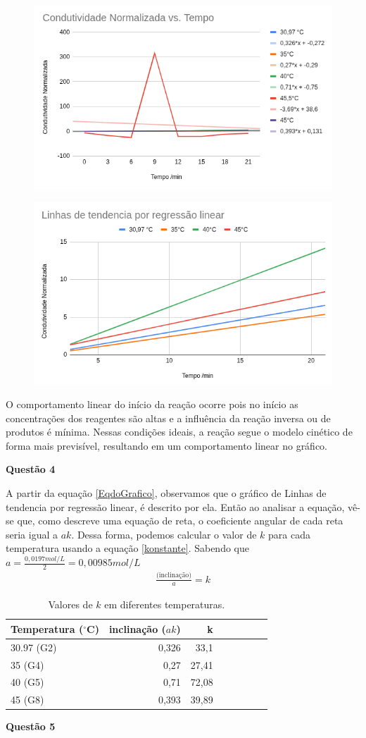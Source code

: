 \documentclass{article}
\begin{document}
\begin{figure}[H]
    \centering
    \includegraphics[width=.5\linewidth]{figs/graph3.png}
    \label{grafico3}
\end{figure}
\begin{figure}[H]
	\centering
	\includegraphics[width=.5\linewidth]{figs/LinhaTendencia.png}
	\label{grafico4}
\end{figure}
O comportamento linear do início da reação ocorre pois no início as concentrações dos reagentes são altas e a influência da reação inversa ou de produtos é mínima. Nessas condições ideais, a reação segue o modelo cinético de forma mais previsível, resultando em um comportamento linear no gráfico.

\textbf{Questão 4}

A partir da equação \cref{EqdoGrafico}, observamos que o gráfico de Linhas de tendencia por regressão linear, é descrito por ela. Então ao analisar a equação, vê-se que, como descreve uma equação de reta, o coeficiente angular de cada reta seria igual a \(ak\).
Dessa forma, podemos calcular o valor de \(k\) para cada temperatura usando a equação \cref{konstante}. Sabendo que \(a = \frac{0,0197 mol/L}{2} = 0,00985 mol/L\) 
\begin{align}
	\frac{\text{(inclinação)}}{a} = k
	\label{konstante}
\end{align}

\begin{table}[H]
\centering
\caption{Valores de $k$ em diferentes temperaturas.}
\label{tab:k_norm}
\begin{tabular}{lrrrrrrr}
\toprule
\textbf{Temperatura ($^{\circ}$C)}    & \textbf{inclinação ($ak$)} & {\textbf{k}} \\
\midrule
30.97 (G2) & 0,326 & 33,1\\
35 (G4)    & 0,27 & 27,41\\
40 (G5)    & 0,71 & 72,08\\
45 (G8)    & 0,393 & 39,89\\
\bottomrule
\end{tabular}
\end{table}
\textbf{Questão 5}
\end{document}
